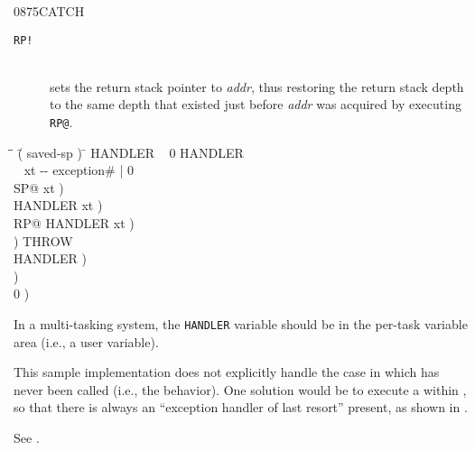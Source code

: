 \begin{worddef}{0875}{CATCH}
\begin{implement}
\begin{description}
		\item[\texttt{RP!}]  \\
			sets the return stack pointer to \emph{addr}, thus restoring the
			return stack depth to the same depth that existed just before
			\emph{addr} was acquired by executing \texttt{RP@}.
		\end{description}

		\ttfamily
		\begin{tabbing}
		\tab \= \tab \= \hspace{7em} \= ( saved-sp ) \= \kill
		 HANDLER ~ 0 HANDLER \word{!} ~   \\[\parskip]

		\+ \word{:}  ~  xt -{}- exception\# | 0    \\
			SP@ 					\>\>  xt )\>   \\
			HANDLER  		\>\>  xt )\>   \\
			RP@ HANDLER \word{!}			\>\>  xt )\>   \\
								\>\>  )	  \>   THROW \\
			 HANDLER \word{!}	\>\>  )   \>   \\
			 		\>\>  )   \>   \\
										\>\>  0 ) \>   \\
		\word{;}
		\end{tabbing}

		\dffamily
		In a multi-tasking system, the \texttt{HANDLER} variable should be in
		the per-task variable area (i.e., a user variable).

		This sample implementation does not explicitly handle the case in
		which  has never been called (i.e., the 
		behavior). One solution would be to execute a  within
		, so that there is always an ``exception handler of last
		resort'' present, as shown in .
	\end{implement}

	\begin{testing} %
		See .
	\end{testing}
\end{worddef}


